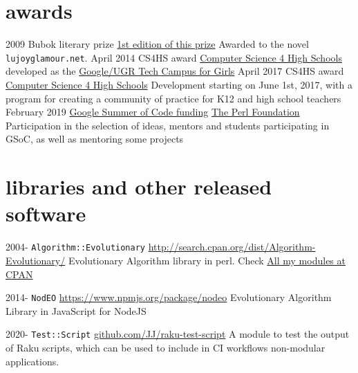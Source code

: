 \documentclass[]{friggeri-jj-cv}
\begin{document}
\section{awards}
\begin{entrylist}
 \entry
    {2009}
    {Bubok literary prize}
    {\href{http://cultura.elpais.com/cultura/2009/05/06/actualidad/1241560804_850215.html}{1st
        edition of this prize}}
    {Awarded to the novel {\tt lujoyglamour.net}.}
 \entry
    {April 2014}
    {CS4HS award}
    {\href{http://cs4hs.com}{Computer Science 4 High Schools}}
    {developed as the \href{http://cs4hs.ugr.es}{Google/UGR Tech Campus for Girls}}
 \entry
    {April 2017}
    {CS4HS award}
    {\href{http://cs4hs.com}{Computer Science 4 High Schools}}
    {Development starting on June 1st, 2017, with a program for
      creating a community of practice for K12 and high school
      teachers}
    \entry
    {February 2019}
    {\href{https://summerofcode.withgoogle.com/organizations/4713351599357952/}{Google Summer of Code funding}}
    {\href{https://www.perlfoundation.org/}{The Perl Foundation}}
    {Participation in the selection of ideas, mentors and students
      participating in GSoC, as well as mentoring some projects}

\end{entrylist}

\newpage

\section{libraries and other released software}

\begin{entrylist}
  \entry
    {2004-}
    {{\tt Algorithm::Evolutionary}}
    {\href{http://search.cpan.org/dist/Algorithm-Evolutionary/}{http://search.cpan.org/dist/Algorithm-Evolutionary/}}
    {Evolutionary Algorithm library in
      perl. Check \href{http://search.cpan.org/~jmerelo/}{All my modules at CPAN}}

    \entry
    {2014-}
    {{\tt NodEO}}
    {\href{https://npmjs.org/package/nodeo}{https://www.npmjs.org/package/nodeo}}
    {Evolutionary Algorithm Library in JavaScript for NodeJS}

    \entry
    {2020-}
    {{\tt Test::Script}}
    {\href{https://github.com/JJ/raku-test-script}{github.com/JJ/raku-test-script}}
    {A module to test the output of Raku scripts, which can be used to include in CI
    workflows non-modular applications.}

\end{entrylist}
\end{document}
